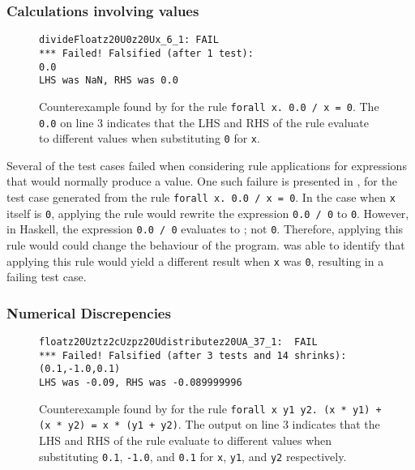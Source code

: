 {\subsubsection{Calculations involving \NaN values}

\begin{figure}
  \begin{verbatim}
divideFloatz20U0z20Ux_6_1: FAIL
*** Failed! Falsified (after 1 test):
0.0
LHS was NaN, RHS was 0.0
  \end{verbatim}
  \caption{Counterexample found by \Rulecheck for the rule \texttt{forall x. 0.0
/ x = 0}. The \texttt{0.0} on line 3 indicates that the LHS and RHS
of the rule evaluate to different values when substituting \texttt{0} for \texttt{x}.}
  \label{fig:div0}
\end{figure}

Several of the test cases failed when considering rule applications for
expressions that would normally produce a \NaN value. One such failure is
presented in , for the test case generated from the rule
\texttt{forall x. 0.0 / x = 0}. In the case when \texttt{x} itself is
\texttt{0}, applying the rule would rewrite the expression \texttt{0.0 / 0} to
\texttt{0}. However, in Haskell, the expression \texttt{0.0 / 0} evaluates to
\NaN; not \texttt{0}. Therefore, applying this rule would could change the
behaviour of the program. \Rulecheck was able to identify that applying this
rule would yield a different result when \texttt{x} was \texttt{0}, resulting in
a failing test case.

\subsubsection{Numerical Discrepencies}

\begin{figure}
  \begin{verbatim}
floatz20Uztz2cUzpz20Udistributez20UA_37_1:  FAIL
*** Failed! Falsified (after 3 tests and 14 shrinks):
(0.1,-1.0,0.1)
LHS was -0.09, RHS was -0.089999996
  \end{verbatim}
  \caption{Counterexample found by \Rulecheck for the rule \texttt{forall x y1
y2. (x * y1) + (x * y2) = x * (y1 + y2)}. The output on line 3 indicates
that the LHS and RHS of the rule evaluate to different values when substituting
\texttt{0.1}, \texttt{-1.0}, and \texttt{0.1} for \texttt{x}, \texttt{y1}, and \texttt{y2} respectively.}
  \label{fig:dist}
\end{figure}

}
